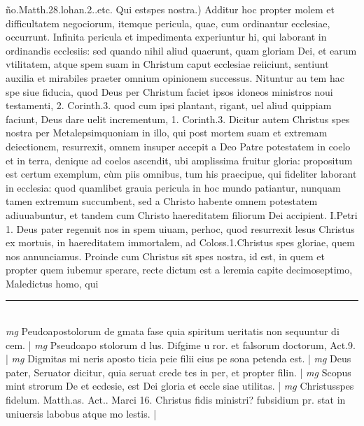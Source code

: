 \documentclass{article}
\begin{document}
\begin{pages}
ño.Matth.28.lohan.2..etc.  \pend\pstart Qui estspes nostra.) Additur hoc propter molem et difficultatem negociorum, itemque  pericula, quae, cum ordinantur ecclesiae, occurrunt. Infinita pericula et impedimenta experiuntur hi, qui laborant in ordinandis ecclesiis: sed quando nihil aliud quaerunt, quam gloriam Dei, et earum vtilitatem, atque  spem suam in Christum caput ecclesiae reiiciunt, sentiunt auxilia et mirabiles praeter omnium opinionem successus. Nituntur au tem hac spe siue fiducia, quod Deus per Christum faciet ipsos idoneos ministros noui testamenti, 2. Corinth.3. quod cum ipsi plantant, rigant, uel aliud quippiam faciunt, Deus dare uelit incrementum, 1. Corinth.3. Dicitur autem Christus spes nostra per Metalepsimquoniam in illo, qui post mortem suam et extremam deiectionem, resurrexit, omnem insuper accepit a Deo Patre potestatem in coelo et in terra, denique  ad coelos ascendit, ubi amplissima fruitur gloria: propositum est certum exemplum, cùm piis omnibus, tum his praecipue, qui fideliter laborant in ecclesia: quod quamlibet grauia pericula in hoc mundo patiantur, nunquam tamen extremum succumbent, sed a Christo habente omnem potestatem adiuuabuntur, et tandem cum Christo haereditatem filiorum Dei accipient. I.Petri 1. Deus pater regenuit nos in spem uiuam, perhoc, quod resurrexit lesus Christus ex mortuis, in haereditatem immortalem, ad Coloss.1.Christus spes gloriae, quem nos annunciamus.  \pend\pstart Proinde cum Christus sit spes nostra, id est, in quem et propter quem iubemur sperare, recte dictum est a leremia capite decimoseptimo, Maledictus homo, qui  \pend
\vspace{0.5cm}\noindent
\vspace{0.2cm}\rule{1cm}{0.2pt}\\ 
\hspace{0.2cm}\textit{mg}
\footnotesize Peudoapostolorum de gmata fase quia spiritum ueritatis non sequuntur di cem. 
\normalsize| 
\hspace{0.2cm}\textit{mg}
\footnotesize Pseudoapo stolorum d lus. Difgime u ror. et falsorum doctorum, Act.9. 
\normalsize| 
\hspace{0.2cm}\textit{mg}
\footnotesize Digmitas mi neris aposto ticia peie filii eius pe sona petenda est. 
\normalsize| 
\hspace{0.2cm}\textit{mg}
\footnotesize Deus pater, Seruator dicitur, quia seruat crede tes in per, et propter filin. 
\normalsize| 
\hspace{0.2cm}\textit{mg}
\footnotesize Scopus mint strorum De et ecdesie, est Dei gloria et eccle siae utilitas. 
\normalsize| 
\hspace{0.2cm}\textit{mg}
\footnotesize Christusspes fidelum. Matth.as. Act.. Marci 16. Christus fidis ministri? fubsidium pr. stat in uniuersis labobus atque  mo lestis. 
\normalsize| 

\end{pages}
\end{document}

